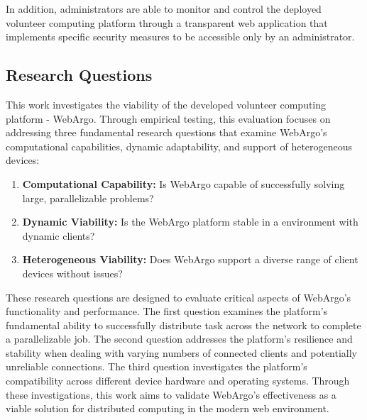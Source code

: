In addition, administrators are able to monitor and control the deployed volunteer computing platform through a transparent web application that implements specific security measures to be accessible only by an administrator.

\subsection{Research Questions}
\label{subsec:into:objectives:questions}
This work investigates the viability of the developed volunteer computing platform - WebArgo. Through empirical testing, this evaluation focuses on addressing three fundamental research questions that examine WebArgo's computational capabilities, dynamic adaptability, and support of heterogeneous devices:
\begin{enumerate}
    \item \textbf{Computational Capability:} Is WebArgo capable of successfully solving large, parallelizable problems?
    \item \textbf{Dynamic Viability:} Is the WebArgo platform stable in a environment with dynamic clients?
    \item \textbf{Heterogeneous Viability:} Does WebArgo support a diverse range of client devices without issues?
\end{enumerate}
These research questions are designed to evaluate critical aspects of WebArgo's functionality and performance. The first question examines the platform's fundamental ability to successfully distribute task across the network to complete a parallelizable job. The second question addresses the platform's resilience and stability when dealing with varying numbers of connected clients and potentially unreliable connections. The third question investigates the platform's compatibility across different device hardware and operating systems. Through these investigations, this work aims to validate WebArgo's effectiveness as a viable solution for distributed computing in the modern web environment.

